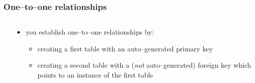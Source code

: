 \documentclass[\printmode,compress,xcolor=dvipsnames]{beamer}
\begin{document}
\begin{frame}
  \frametitle<+->{One--to--one relationships}

  \begin{columns}[T]
    \begin{column}{\leftcolumn}
    \end{column}
    \begin{column}{\rightcolumn}
      \begin{itemize}[<+- | alert@+->]
    
        \item you establish one--to--one relationships by:


           \begin{itemize}[<+- | alert@+->]

              \item creating a first table with an auto--generated primary key

              \item creating a second table with a (\emph{not}
                      auto--generated) foreign key which points to an instance
                      of the first table
    
           \end{itemize}

      \end{itemize}
    \end{column}
  \end{columns}

\end{frame}

\end{document}
